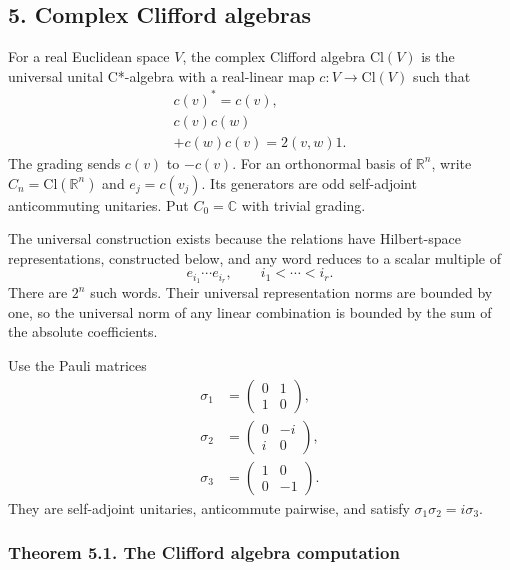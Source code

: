 \documentclass[
  11pt,
]{article}
\begin{document}
\subsection{5. Complex Clifford
algebras}\label{complex-clifford-algebras}

For a real Euclidean space \(V\), the complex Clifford algebra
\(\mathrm{Cl}(V)\) is the universal unital C*-algebra with a real-linear
map \(c:V\to\mathrm{Cl}(V)\) such that \[
\begin{gathered}
c(v)^*=c(v),\\
c(v)c(w)\\+c(w)c(v)=2(v,w)1.
\end{gathered}
\tag{5.1}
\] The grading sends \(c(v)\) to \(-c(v)\). For an orthonormal basis of
\(\mathbb R^n\), write \(C_n=\mathrm{Cl}(\mathbb R^n)\) and
\(e_j=c(v_j)\). Its generators are odd self-adjoint anticommuting
unitaries. Put \(C_0=\mathbb C\) with trivial grading.

The universal construction exists because the relations have
Hilbert-space representations, constructed below, and any word reduces
to a scalar multiple of \[
e_{i_1}\cdots e_{i_r},\qquad
i_1<\cdots<i_r.
\tag{5.2}
\] There are \(2^n\) such words. Their universal representation norms
are bounded by one, so the universal norm of any linear combination is
bounded by the sum of the absolute coefficients.

Use the Pauli matrices \[
\begin{aligned}
\sigma_1&=\begin{pmatrix}0&1\\1&0\end{pmatrix},\\
\sigma_2&=\begin{pmatrix}0&-i\\i&0\end{pmatrix},\\
\sigma_3&=\begin{pmatrix}1&0\\0&-1\end{pmatrix}.
\end{aligned}
\tag{5.3}
\] They are self-adjoint unitaries, anticommute pairwise, and satisfy
\(\sigma_1\sigma_2=i\sigma_3\).

\subsubsection{Theorem 5.1. The Clifford algebra
computation}\label{theorem-5.1.-the-clifford-algebra-computation}
\end{document}
